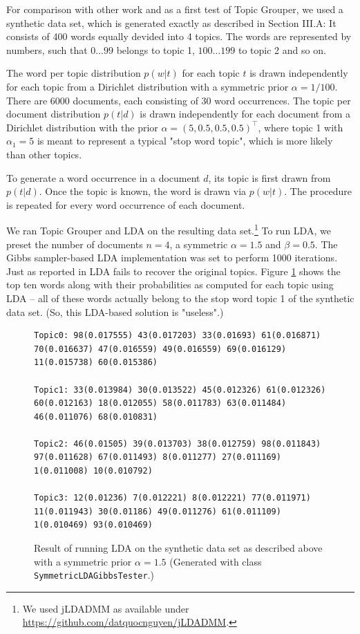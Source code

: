 \documentclass[10pt, a4paper, oneside]{article}
\begin{document}
For comparison with other work and as a first test of Topic Grouper, we used a synthetic data set, which is generated exactly as described 
in \cite{Tan_topic-weak-correlatedlatent} Section III.A:
It consists of 400 words equally devided into 4 topics. The words are represented by numbers, such that $0\ldots99$ belongs to topic 1, $100\ldots199$ to topic 2 and so on. 

The word per topic distribution $p(w|t)$ for each topic $t$ is drawn independently for each topic from a Dirichlet distribution with a symmetric prior $\alpha = 1/100$. There are 6000 documents, each consisting of 30 word occurrences. The topic per document distribution $p(t|d)$ is drawn independently for each document from a Dirichlet distribution with the prior $\alpha = (5, 0.5, 0.5, 0.5)^\top$, where topic 1 with $\alpha_1 = 5$ is meant to represent a typical "stop word topic", which is more likely than other topics. 

To generate a word occurrence in a document $d$, its topic is first 
drawn from $p(t|d)$. Once the topic is known, the word is drawn via $p(w|t)$. The procedure is repeated for every word occurrence of each document.

We ran Topic Grouper and LDA on the resulting data set.\footnote{We used jLDADMM as available under \href{https://github.com/datquocnguyen/jLDADMM}{https://github.com/datquocnguyen/jLDADMM}.} To run LDA, we preset the number of documents $n = 4$, a symmetric $\alpha = 1.5$ and $\beta = 0.5$.
The Gibbs sampler-based LDA implementation was set to perform 1000 iterations.
Just as reported in \cite{Tan_topic-weak-correlatedlatent} LDA fails to recover the original topics.
Figure \ref{ldasymresult} shows the top ten words along with their probabilities as computed for each topic using LDA -- all of these words actually belong to the stop word topic 1 of the synthetic data set. (So, this LDA-based solution is "useless".)

\begin{figure}
{\tiny
\begin{verbatim}
Topic0: 98(0.017555) 43(0.017203) 33(0.01693) 61(0.016871) 70(0.016637) 47(0.016559) 49(0.016559) 69(0.016129) 11(0.015738) 60(0.015386)

Topic1: 33(0.013984) 30(0.013522) 45(0.012326) 61(0.012326) 60(0.012163) 18(0.012055) 58(0.011783) 63(0.011484) 46(0.011076) 68(0.010831)

Topic2: 46(0.01505) 39(0.013703) 38(0.012759) 98(0.011843) 97(0.011628) 67(0.011493) 8(0.011277) 27(0.011169) 1(0.011008) 10(0.010792)

Topic3: 12(0.01236) 7(0.012221) 8(0.012221) 77(0.011971) 11(0.011943) 30(0.01186) 49(0.011276) 61(0.011109) 1(0.010469) 93(0.010469)
\end{verbatim}}
\caption{Result of running LDA on the synthetic data set as described above with a symmetric prior $\alpha = 1.5$
(Generated with class \texttt{SymmetricLDAGibbsTester}.)}
\label{ldasymresult}
\end{figure}
\end{document}
